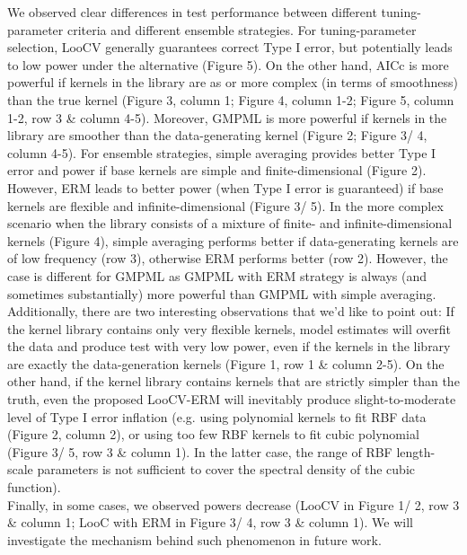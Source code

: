 \documentclass[11pt]{article}
\begin{document}
We observed clear differences in test performance between different tuning-parameter criteria and different ensemble strategies. For tuning-parameter selection, LooCV generally guarantees correct Type I error, but potentially leads to low power under the alternative (Figure 5). On the other hand, AICc is more powerful if kernels in the library are as or more complex (in terms of smoothness) than the true kernel (Figure 3, column 1; Figure 4, column 1-2; Figure 5, column 1-2, row 3 \& column 4-5). Moreover, GMPML is more powerful if kernels in the library are smoother than the data-generating kernel (Figure 2; Figure 3/ 4, column 4-5). For ensemble strategies, simple averaging provides better Type I error and power if base kernels are simple and finite-dimensional (Figure 2). However, ERM leads to better power (when Type I error is guaranteed) if base kernels are flexible and infinite-dimensional (Figure 3/ 5). In the more complex scenario when the library consists of a mixture of finite- and infinite-dimensional kernels (Figure 4), simple averaging performs better if data-generating kernels are of low frequency (row 3), otherwise ERM performs better (row 2). However, the case is different for GMPML as GMPML with ERM strategy is always (and sometimes substantially) more powerful than GMPML with simple averaging. \\

Additionally, there are two interesting observations that we'd like to point out: 
If the kernel library contains only very flexible kernels, model estimates will overfit the data and produce test with very low power, even if the kernels in the library are exactly the data-generation kernels (Figure 1, row 1 \& column 2-5). On the other hand, if the kernel library contains kernels that are strictly simpler than the truth, even the proposed LooCV-ERM will inevitably produce slight-to-moderate level of Type I error inflation (e.g. using polynomial kernels to fit RBF data (Figure 2, column 2), or using too few RBF kernels to fit cubic polynomial (Figure 3/ 5, row 3 \& column 1). In the latter case, the range of RBF  length-scale parameters is not sufficient to cover the spectral density of the cubic function).\\

Finally, in some cases, we observed powers decrease (LooCV in Figure 1/ 2, row 3 \& column 1; LooC with ERM in Figure 3/ 4, row 3 \& column 1). We will investigate the mechanism behind such phenomenon in future work.
\end{document}
